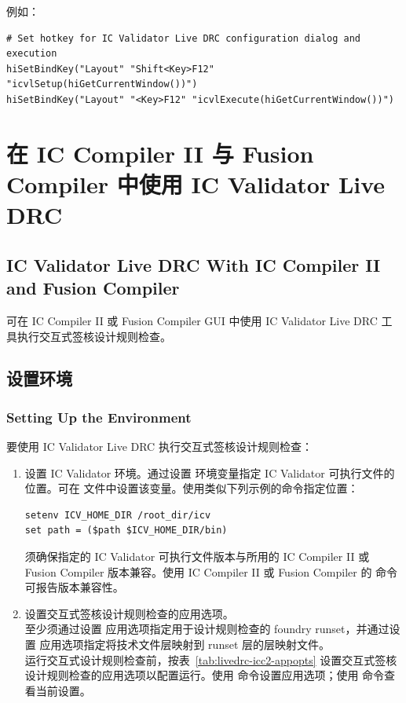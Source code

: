 例如：
\begin{lstlisting}
# Set hotkey for IC Validator Live DRC configuration dialog and execution
hiSetBindKey("Layout" "Shift<Key>F12" "icvlSetup(hiGetCurrentWindow())")
hiSetBindKey("Layout" "<Key>F12" "icvlExecute(hiGetCurrentWindow())")
\end{lstlisting}

\section{在 IC Compiler II 与 Fusion Compiler 中使用 IC Validator Live DRC}
\subsection*{IC Validator Live DRC With IC Compiler II and Fusion Compiler}

可在 IC Compiler II 或 Fusion Compiler GUI 中使用 IC Validator Live DRC 工具执行交互式签核设计规则检查。

\subsection{设置环境}
\subsubsection*{Setting Up the Environment}

要使用 IC Validator Live DRC 执行交互式签核设计规则检查：
\begin{enumerate}
  \item 设置 IC Validator 环境。通过设置  环境变量指定 IC Validator 可执行文件的位置。可在  文件中设置该变量。使用类似下列示例的命令指定位置：
\begin{lstlisting}
setenv ICV_HOME_DIR /root_dir/icv
set path = ($path $ICV_HOME_DIR/bin)
\end{lstlisting}
  须确保指定的 IC Validator 可执行文件版本与所用的 IC Compiler II 或 Fusion Compiler 版本兼容。使用 IC Compiler II 或 Fusion Compiler 的  命令可报告版本兼容性。

  \item 设置交互式签核设计规则检查的应用选项。\\
  至少须通过设置  应用选项指定用于设计规则检查的 foundry runset，并通过设置  应用选项指定将技术文件层映射到 runset 层的层映射文件。\\
  运行交互式设计规则检查前，按表~\ref{tab:livedrc-icc2-appopts} 设置交互式签核设计规则检查的应用选项以配置运行。使用  命令设置应用选项；使用  命令查看当前设置。
\end{enumerate}

